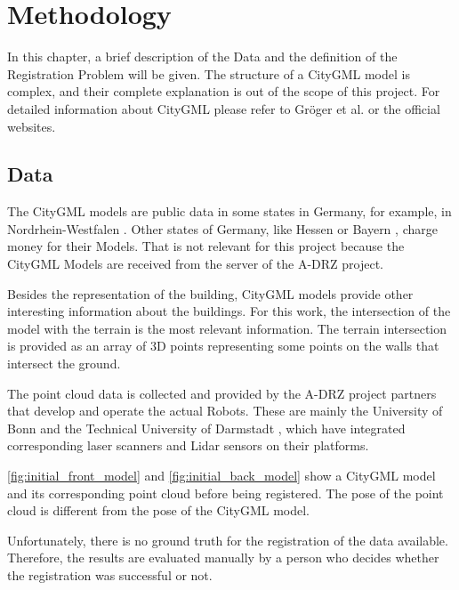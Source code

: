 

    \chapter{Methodology}
        In this chapter, a brief description of the Data and the definition of the Registration Problem will be given.
        The structure of a CityGML model is complex, and their complete explanation is out of the scope of this project.
        For detailed information about CityGML please refer to Gröger et al. \cite{Groger_2012_OGC} or the official websites.

    \section{Data}   
        The CityGML models are public data in some states in Germany, for example, in Nordrhein-Westfalen \cite{NRW3DModel_online}. 
        Other states of Germany, like Hessen \cite{Hessen3DModel_online} or Bayern \cite{Bayern3DModel_online}, charge money for their Models.
        That is not relevant for this project because the CityGML Models are received from the server of the A-DRZ project.

        Besides the representation of the building, CityGML models provide other interesting information about the buildings.
        For this work, the intersection of the model with the terrain is the most relevant information.
        The terrain intersection is provided as an array of 3D points representing some points on the walls that intersect the ground. 
        
        The point cloud data is collected and provided by the A-DRZ project partners that develop and operate the actual Robots.
        These are mainly the University of Bonn \cite{UniBonn_online} and the Technical University of Darmstadt \cite{TUDarmstadt_online},
        which have integrated corresponding laser scanners and Lidar sensors on their platforms.

        \autoref{fig:initial_front_model} and \autoref{fig:initial_back_model} show a CityGML model and its corresponding point cloud
        before being registered. The pose of the point cloud is different from the pose of the CityGML model.
            
        Unfortunately, there is no ground truth for the registration of the data available. 
        Therefore, the results are evaluated manually by a person who decides whether the registration was successful or not.

